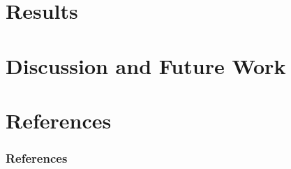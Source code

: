 \documentclass[
    pdf,
    10pt,
    xcolor={svgnames},
  ]{beamer}
\begin{document}
\section{Results}

\section{Discussion and Future Work}


\section{References}
\begin{frame}[allowframebreaks]
  \frametitle{References}
  \printbibliography
\end{frame}
\end{document}
